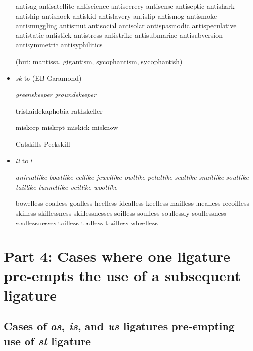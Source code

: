\begin{itemize}
\bgroup \em

antisag antisatellite antiscience antisecrecy antisense antiseptic antishark antiship antishock antiskid antislavery antislip antismog antismoke antismuggling antismut antisocial antisolar antispasmodic antispeculative antistatic antistick antistress antistrike antisubmarine antisubversion antisymmetric antisyphilitics 

(but: mantissa, gigantism, sycophantism, sycophantish)

\egroup

\item {\ebg\emph{\mbox{sk}}} to {} (EB Garamond)

\bgroup \ebg \em
greenskeeper groundskeeper 

triskaidekaphobia rathskeller

miskeep miskept miskick misknow

Catskills Peekskill

\egroup



\item \emph{ll} to \emph{l\hspace{0pt}}

\bgroup \em
animallike bowllike eellike jewellike owllike petallike seallike snaillike soullike taillike tunnellike veillike woollike

bowelless coalless goalless heelless idealless keelless mailless mealless recoilless skilless skillessness skillessnesses soilless soulless soullessly soullessness soullessnesses tailless toolless trailless wheelless

\egroup
\end{itemize}



\section*{Part 4: Cases where one ligature pre-empts the use of a subsequent ligature}

\subsection*{Cases of \emph{as}, \emph{is}, and \emph{us} ligatures pre-empting use of \emph{st} ligature}

\bgroup \em

